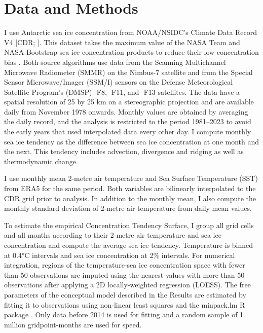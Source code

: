 \documentclass[tc, manuscript]{copernicus}
\begin{document}
\section{Data and Methods}\label{data-and-methods}

I use Antarctic sea ice concentration from NOAA/NSIDC's Climate Data
Record V4 {[}CDR; \citet{meier2014}{]}. This dataset takes the maximum
value of the NASA Team \citep{cavalieri1984} and NASA Bootstrap
\citep{comiso2023} sea ice concentration products to reduce their low
concentration bias \citep{meier2014, meier2021}. Both source algorithms
use data from the Scanning Multichannel Microwave Radiometer (SMMR) on
the Nimbus-7 satellite and from the Special Sensor Microwave/Imager
(SSM/I) sensors on the Defense Meteorological Satellite Program's (DMSP)
-F8, -F11, and -F13 satellites. The data have a spatial resolution of 25
by 25 km on a stereographic projection and are available daily from
November 1978 onwards. Monthly values are obtained by averaging the
daily record, and the analysis is restricted to the period 1981--2023 to
avoid the early years that used interpolated data every other day. I
compute monthly sea ice tendency as the difference between sea ice
concentration at one month and the next. This tendency includes
advection, divergence and ridging as well as thermodynamic change.

I use monthly mean 2-metre air temperature and Sea Surface Temperature
(SST) from ERA5 \citep{hersbach2020} for the same period. Both variables
are bilinearly interpolated to the CDR grid prior to analysis. In
addition to the monthly mean, I also compute the monthly standard
deviation of 2-metre air temperature from daily mean values.

To estimate the empirical Concentration Tendency Surface, I group all
grid cells and all months according to their 2-metre air temperature and
sea ice concentration and compute the average sea ice tendency.
Temperature is binned at 0.4°C intervals and sea ice concentration at
2\% intervals. For numerical integration, regions of the temperature-sea
ice concentration space with fewer than 50 observations are imputed
using the nearest values with more than 50 observations after applying a
2D locally-weighted regression (LOESS). The free parameters of the
conceptual model described in the Results are estimated by fitting it to
observations using non-linear least squares \citep{bates1988} and the
minpack.lm R package \citep{R-minpack.lm}. Only data before 2014 is used
for fitting and a random sample of 1 million gridpoint-months are used
for speed.
\end{document}
